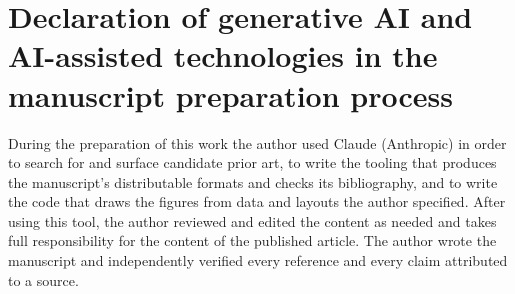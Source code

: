 \documentclass[10pt]{article}
\makeatletter
\newcommand{\tmlr@floatbarrier}{\par\vspace{\z@}%
  \ifx\@deferlist\@empty\else\clearpage\fi}
\let\tmlr@section\section
\renewcommand{\section}{\tmlr@floatbarrier\tmlr@section}
\makeatother
\begin{document}
\section*{Declaration of generative AI and AI-assisted technologies in
the manuscript preparation
process}\label{declaration-of-generative-ai-and-ai-assisted-technologies-in-the-manuscript-preparation-process}

During the preparation of this work the author used Claude (Anthropic)
in order to search for and surface candidate prior art, to write the
tooling that produces the manuscript's distributable formats and checks
its bibliography, and to write the code that draws the figures from data
and layouts the author specified. After using this tool, the author
reviewed and edited the content as needed and takes full responsibility
for the content of the published article. The author wrote the
manuscript and independently verified every reference and every claim
attributed to a source.
\end{document}
